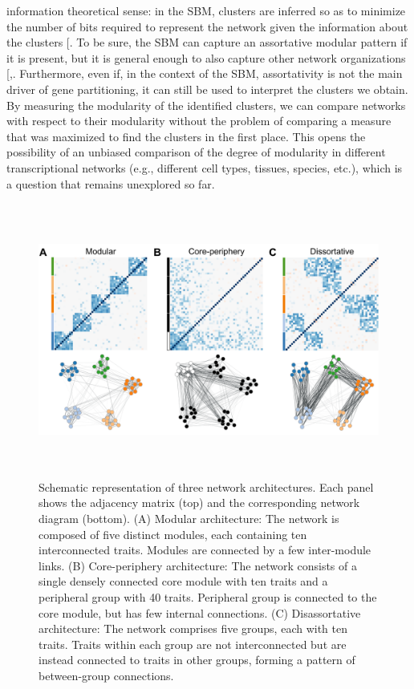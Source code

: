 \documentclass[
]{article}
\begin{document}
information theoretical sense: in the SBM, clusters are inferred so as
to minimize the number of bits required to represent the network given
the information about the clusters
{[}\citeproc{ref-Peixoto2023-xd}{18}{]}. To be sure, the SBM can capture
an assortative modular pattern if it is present, but it is general
enough to also capture other network organizations
{[},\citeproc{ref-Zhang2020-up}{19}{]}.
Furthermore, even if, in the context of the SBM, assortativity is not
the main driver of gene partitioning, it can still be used to interpret
the clusters we obtain. By measuring the modularity of the identified
clusters, we can compare networks with respect to their modularity
without the problem of comparing a measure that was maximized to find
the clusters in the first place. This opens the possibility of an
unbiased comparison of the degree of modularity in different
transcriptional networks (e.g., different cell types, tissues, species,
etc.), which is a question that remains unexplored so far.

\begin{figure}
\centering
\includegraphics[width=\textwidth,height=9cm]{figures/network_strucuture_figure.png}
\caption{Schematic representation of three network architectures. Each
panel shows the adjacency matrix (top) and the corresponding network
diagram (bottom). (A) Modular architecture: The network is composed of
five distinct modules, each containing ten interconnected traits.
Modules are connected by a few inter-module links. (B) Core-periphery
architecture: The network consists of a single densely connected core
module with ten traits and a peripheral group with 40 traits. Peripheral
group is connected to the core module, but has few internal connections.
(C) Disassortative architecture: The network comprises five groups, each
with ten traits. Traits within each group are not interconnected but are
instead connected to traits in other groups, forming a pattern of
between-group connections.}\label{fig:network_structure}
\end{figure}
\end{document}
